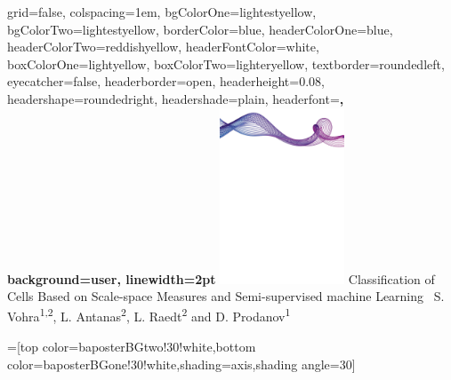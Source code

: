 \documentclass[portrait,final,a0paper]{baposter}
\begin{document}


\newlength{\leftimgwidth}
\begin{poster}%
  {
  grid=false,
  colspacing=1em,
  bgColorOne=lightestyellow,
  bgColorTwo=lightestyellow,
  borderColor=blue,
  headerColorOne=blue,
  headerColorTwo=reddishyellow,
  headerFontColor=white,
  boxColorOne=lightyellow,
  boxColorTwo=lighteryellow,
  textborder=roundedleft,
  eyecatcher=false,
  headerborder=open,
  headerheight=0.08\textheight,
  headershape=roundedright,
  headershade=plain,
  headerfont=\Large\sf\bf, %
  background=user,
  linewidth=2pt
  }
  {\includegraphics[width=10em]{back}} %
  {\sf %
  Classification of Cells Based on Scale-space Measures and Semi-supervised machine Learning}
  {\sf %
  \vspace{1em}\ S. Vohra\textsuperscript{1,2}, L. Antanas\textsuperscript{2}, L. Raedt\textsuperscript{2} and D. Prodanov\textsuperscript{1}
  }
  {%
    
  }
   

  =[top color=baposterBGtwo!30!white,bottom color=baposterBGone!30!white,shading=axis,shading angle=30]

     \setlength{\leftimgwidth}{0.78em+8.0em}


\end{poster}
\end{document}
